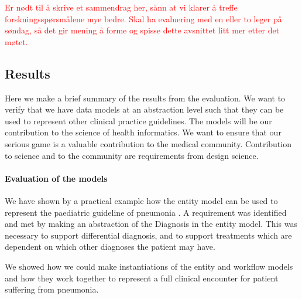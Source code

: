 \textcolor{red}{Er nødt til å skrive et sammendrag her, sånn at vi klarer å treffe forskningsspørsmålene mye bedre. Skal ha evaluering med en eller to leger på søndag, så det gir mening å forme og spisse dette avsnittet litt mer etter det møtet.}



\subsection{Results}
Here we make a brief summary of the results from the evaluation. We want to verify that we have data models at an abstraction level such that they can be used to represent other clinical practice guidelines. The models will be our contribution to the science of health informatics. We want to ensure that our serious game is a valuable contribution to the medical community. Contribution to science and to the community are requirements from design science.

\paragraph{Evaluation of the models}
We have shown by a practical example how the entity model can be used to represent the paediatric guideline of pneumonia \parencite{RepublicofKeny2016}. A requirement was identified and met by making an abstraction of the Diagnosis in the entity model. This was necessary to support differential diagnosis, and to support treatments which are dependent on which other diagnoses the patient may have. 

We showed how we could make instantiations of the entity and workflow models and how they work together to represent a full clinical encounter for patient suffering from pneumonia.



